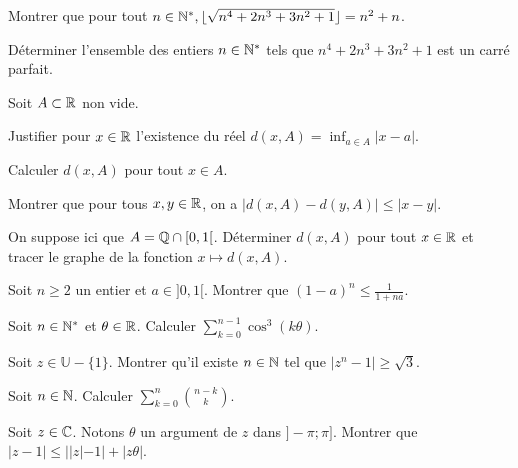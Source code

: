 \begin{exercise}
\begin{questions}
\item Montrer que pour tout $n\in\mathbb{N}^*, \lfloor\sqrt{n^4+2n^3+3n^2+1}\rfloor=n^2+n$.
\item Déterminer l'ensemble des entiers $n\in\mathbb{N}^*$ tels que $n^4+2n^3+3n^2+1$ est un carré parfait.
\end{questions}
\end{exercise}

\begin{exercise}
\begin{questions}
\item Soit $A\subset\mathbb{R}$ non vide.
\begin{questions}
\item Justifier pour $x\in\mathbb{R}$ l'existence du réel $d(x,A)=\inf_{a\in A}|x-a|$.
\item Calculer $d(x,A)$ pour tout $x\in A$.
\item Montrer que pour tous $x,y\in\mathbb{R}$, on a $|d(x,A)-d(y,A)|\le|x-y|$.
\end{questions}
\item On suppose ici que $A=\mathbb{Q}\cap[0,1[$. Déterminer $d(x,A)$ pour tout $x\in\mathbb{R}$ et tracer le graphe de la fonction $x\mapsto d(x,A)$.
\end{questions}
\end{exercise}

\begin{exercise}
Soit $n \ge 2$ un entier et $a \in ]0,1[$. Montrer que $(1-a)^n \le \frac{1}{1+na}$.
\end{exercise}

\begin{exercise}
Soit $n\in\mathbb{N}^*$ et $\theta\in\mathbb{R}$. Calculer $\displaystyle\sum_{k=0}^{n-1}\cos^3(k\theta)$.
\end{exercise}

\begin{exercise}
Soit $z\in \mathbb{U} - \{1\}$. Montrer qu'il existe $n\in\mathbb{N}$ tel que $\left| z^n - 1 \right| \ge \sqrt{3}$.
\end{exercise}

\begin{exercise}
Soit $n\in\mathbb{N}$. Calculer $\displaystyle\sum_{k=0}^{n}\binom{n-k}{k}$.
\end{exercise}

\begin{exercise}
Soit $z\in \mathbb{C}$. Notons $\theta$ un argument de $z$ dans $]-\pi; \pi]$.
Montrer que $|z-1|\le ||z|-1|+|z\theta|$.
\end{exercise}

